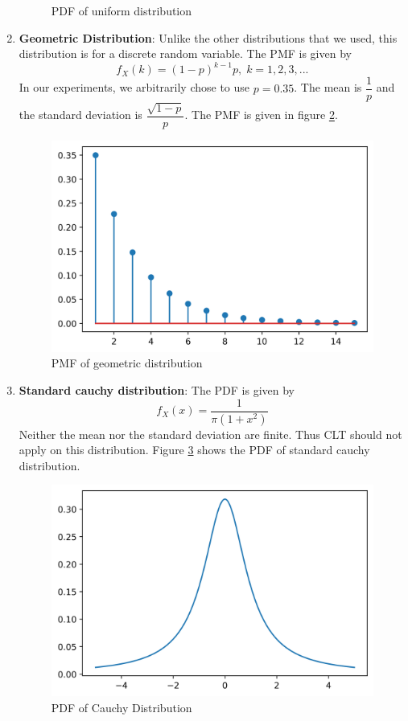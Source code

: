 \documentclass{article}
\begin{document}
\begin{enumerate}
\begin{figure}[H]
        \caption{PDF of uniform distribution}
        \label{uni_pdf}
    \end{figure}
    \item \textbf{Geometric Distribution}: Unlike the other distributions that we used, this distribution is for a discrete random variable. The PMF is given by
    $$f_X(k) = (1-p)^{k-1}p,\; k=1,2,3,...$$
    In our experiments, we arbitrarily chose to use $p=0.35$. The mean is $\dfrac{1}{p}$ and the standard deviation is $\dfrac{\sqrt{1-p}}{p}$. The PMF is given in figure \ref{geom_pmf}. 
    \begin{figure}[H]
        \centering
        \includegraphics[scale=0.5]{images/geometric.png}
        \caption{PMF of geometric distribution}
        \label{geom_pmf}
    \end{figure}
    \item \textbf{Standard cauchy distribution}: The PDF is given by $$f_X(x) = \dfrac{1}{\pi (1+x^2)}$$ Neither the mean nor the standard deviation are finite. Thus CLT should not apply on this distribution. Figure \ref{cauchy_pdf} shows the PDF of standard cauchy distribution.
    \begin{figure}[H]
        \centering
        \includegraphics[scale=0.4]{images/cauchy.png}
        \caption{PDF of Cauchy Distribution}
        \label{cauchy_pdf}
    \end{figure}
\end{enumerate}
\end{document}
